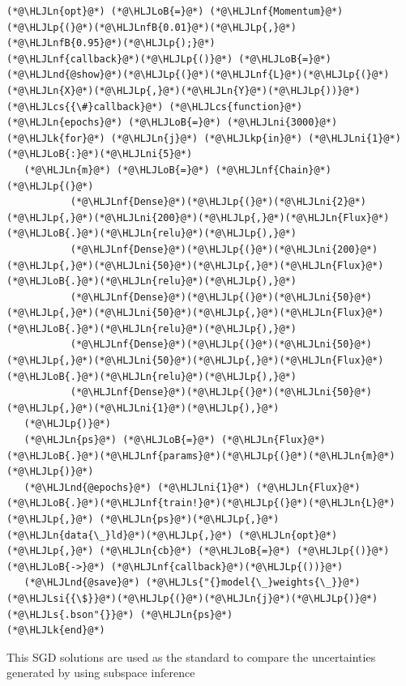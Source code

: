 \documentclass[12pt,a4paper]{article}
\newcommand{\HLJLk}[1]{\textcolor[RGB]{148,91,176}{\textbf{#1}}}
\newcommand{\HLJLkp}[1]{\textcolor[RGB]{148,91,176}{\textbf{#1}}}
\newcommand{\HLJLn}[1]{#1}
\newcommand{\HLJLnd}[1]{\textcolor[RGB]{214,102,97}{#1}}
\newcommand{\HLJLnf}[1]{\textcolor[RGB]{66,102,213}{#1}}
\newcommand{\HLJLs}[1]{\textcolor[RGB]{201,61,57}{#1}}
\newcommand{\HLJLsi}[1]{#1}
\newcommand{\HLJLnfB}[1]{\textcolor[RGB]{59,151,46}{#1}}
\newcommand{\HLJLni}[1]{\textcolor[RGB]{59,151,46}{#1}}
\newcommand{\HLJLoB}[1]{\textcolor[RGB]{102,102,102}{\textbf{#1}}}
\newcommand{\HLJLp}[1]{#1}
\newcommand{\HLJLcs}[1]{\textcolor[RGB]{153,153,119}{\textit{#1}}}
\begin{document}
\begin{lstlisting}
(*@\HLJLn{opt}@*) (*@\HLJLoB{=}@*) (*@\HLJLnf{Momentum}@*)(*@\HLJLp{(}@*)(*@\HLJLnfB{0.01}@*)(*@\HLJLp{,}@*) (*@\HLJLnfB{0.95}@*)(*@\HLJLp{);}@*)
(*@\HLJLnf{callback}@*)(*@\HLJLp{()}@*) (*@\HLJLoB{=}@*) (*@\HLJLnd{@show}@*)(*@\HLJLp{(}@*)(*@\HLJLnf{L}@*)(*@\HLJLp{(}@*)(*@\HLJLn{X}@*)(*@\HLJLp{,}@*)(*@\HLJLn{Y}@*)(*@\HLJLp{))}@*) (*@\HLJLcs{{\#}callback}@*) (*@\HLJLcs{function}@*)
(*@\HLJLn{epochs}@*) (*@\HLJLoB{=}@*) (*@\HLJLni{3000}@*)
(*@\HLJLk{for}@*) (*@\HLJLn{j}@*) (*@\HLJLkp{in}@*) (*@\HLJLni{1}@*)(*@\HLJLoB{:}@*)(*@\HLJLni{5}@*)
   (*@\HLJLn{m}@*) (*@\HLJLoB{=}@*) (*@\HLJLnf{Chain}@*)(*@\HLJLp{(}@*)
           (*@\HLJLnf{Dense}@*)(*@\HLJLp{(}@*)(*@\HLJLni{2}@*)(*@\HLJLp{,}@*)(*@\HLJLni{200}@*)(*@\HLJLp{,}@*)(*@\HLJLn{Flux}@*)(*@\HLJLoB{.}@*)(*@\HLJLn{relu}@*)(*@\HLJLp{),}@*)
           (*@\HLJLnf{Dense}@*)(*@\HLJLp{(}@*)(*@\HLJLni{200}@*)(*@\HLJLp{,}@*)(*@\HLJLni{50}@*)(*@\HLJLp{,}@*)(*@\HLJLn{Flux}@*)(*@\HLJLoB{.}@*)(*@\HLJLn{relu}@*)(*@\HLJLp{),}@*)
           (*@\HLJLnf{Dense}@*)(*@\HLJLp{(}@*)(*@\HLJLni{50}@*)(*@\HLJLp{,}@*)(*@\HLJLni{50}@*)(*@\HLJLp{,}@*)(*@\HLJLn{Flux}@*)(*@\HLJLoB{.}@*)(*@\HLJLn{relu}@*)(*@\HLJLp{),}@*)
           (*@\HLJLnf{Dense}@*)(*@\HLJLp{(}@*)(*@\HLJLni{50}@*)(*@\HLJLp{,}@*)(*@\HLJLni{50}@*)(*@\HLJLp{,}@*)(*@\HLJLn{Flux}@*)(*@\HLJLoB{.}@*)(*@\HLJLn{relu}@*)(*@\HLJLp{),}@*)
           (*@\HLJLnf{Dense}@*)(*@\HLJLp{(}@*)(*@\HLJLni{50}@*)(*@\HLJLp{,}@*)(*@\HLJLni{1}@*)(*@\HLJLp{),}@*)
   (*@\HLJLp{)}@*)
   (*@\HLJLn{ps}@*) (*@\HLJLoB{=}@*) (*@\HLJLn{Flux}@*)(*@\HLJLoB{.}@*)(*@\HLJLnf{params}@*)(*@\HLJLp{(}@*)(*@\HLJLn{m}@*)(*@\HLJLp{)}@*)
   (*@\HLJLnd{@epochs}@*) (*@\HLJLni{1}@*) (*@\HLJLn{Flux}@*)(*@\HLJLoB{.}@*)(*@\HLJLnf{train!}@*)(*@\HLJLp{(}@*)(*@\HLJLn{L}@*)(*@\HLJLp{,}@*) (*@\HLJLn{ps}@*)(*@\HLJLp{,}@*) (*@\HLJLn{data{\_}ld}@*)(*@\HLJLp{,}@*) (*@\HLJLn{opt}@*)(*@\HLJLp{,}@*) (*@\HLJLn{cb}@*) (*@\HLJLoB{=}@*) (*@\HLJLp{()}@*) (*@\HLJLoB{->}@*) (*@\HLJLnf{callback}@*)(*@\HLJLp{())}@*) 
   (*@\HLJLnd{@save}@*) (*@\HLJLs{"{}model{\_}weights{\_}}@*)(*@\HLJLsi{{\$}}@*)(*@\HLJLp{(}@*)(*@\HLJLn{j}@*)(*@\HLJLp{)}@*)(*@\HLJLs{.bson"{}}@*) (*@\HLJLn{ps}@*)
(*@\HLJLk{end}@*)
\end{lstlisting}

This SGD solutions are used as the standard to compare the uncertainties generated by using subspace inference
\end{document}
